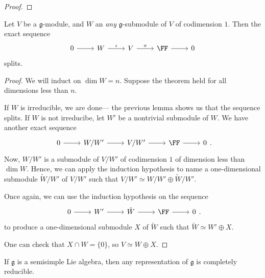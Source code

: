 \documentclass{article}
\newcommand*\frkg{{\ensuremath{\mathfrak{g}}}}
\begin{document}
\begin{proof}

\end{proof}

\begin{lemma}
    Let $V$ be a $\frkg$-module, and $W$ an \textit{any} $\frkg$-submodule of $V$ of codimension $1$.
    Then the exact sequence
    \[
        \begin{tikzcd}
            0 \arrow[r] & W \arrow[r, "\iota"] & V \arrow[r, "\pi"] & \FF \arrow[r] & 0
        \end{tikzcd}
    \]
    splits.
\end{lemma}

\begin{proof}
    We will induct on $\dim W = n$.
    Suppose the theorem held for all dimensions less than $n$. 

    If $W$ is irreducible, we are done--- the previous lemma shows us that the sequence splits.
    If $W$ is not irreducibe, let $W'$ be a nontrivial submodule of $W$.
    We have another exact sequence
    \[
        \begin{tikzcd}
            0 \arrow[r] & W/W' \arrow[r] & V/W' \arrow[r] & \FF \arrow[r] & 0
        \end{tikzcd}.
    \]
    Now, $W/W'$ is a submodule of $V/W'$ of codimension $1$ of dimension less than $\dim W$.
    Hence, we can apply the induction hypothesis to name a one-dimensional submodule $\tilde{W}/W'$ of $V/W'$ such that $V/W' \simeq W/W' \oplus \tilde{W}/W'$.

    Once again, we can use the induction hypothesis on the sequence
    \[
        \begin{tikzcd}
            0 \arrow[r] & W' \arrow[r] & \tilde{W} \arrow[r] & \FF \arrow[r] & 0
        \end{tikzcd}.
    \]
    to produce a one-dimensional submodule $X$ of $\tilde{W}$ such that $\tilde{W} \simeq W' \oplus X$.

    One can check that $X \cap W = \{0\}$, so $V \simeq W \oplus X$.
\end{proof}


\begin{theorem}
    If $\frkg$ is a semisimple Lie algebra, then any representation of $\frkg$ is completely reducible.
\end{theorem}
\end{document}

